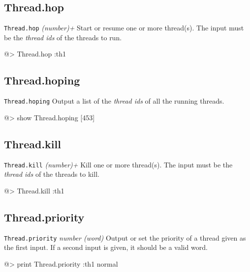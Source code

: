 \subsection*{Thread.hop} 

{\tt Thread.hop} {\it (number)+}
\newline\newline
Start or resume one or more thread(s). The input must be the {\em thread ids} of the threads to run.
\begin{verbatimtab}
@> Thread.hop :th1
\end{verbatimtab}

\subsection*{Thread.hoping} 

{\tt Thread.hoping}
\newline\newline
Output a list of the {\em thread ids} of all the running threads.
\begin{verbatimtab}
@> show Thread.hoping
[453]
\end{verbatimtab}

\subsection*{Thread.kill} 

{\tt Thread.kill} {\it (number)+}
\newline\newline
Kill one or more thread(s). The input must be the {\em thread ids} of the threads to kill.
\begin{verbatimtab}
@> Thread.kill :th1
\end{verbatimtab}

\subsection*{Thread.priority} 

{\tt Thread.priority} {\it number (word)}
\newline\newline
Output or set the priority of a thread given as the first input. If a second input is given, it should be a valid word.
\begin{verbatimtab}
@> print Thread.priority :th1
normal
\end{verbatimtab}

